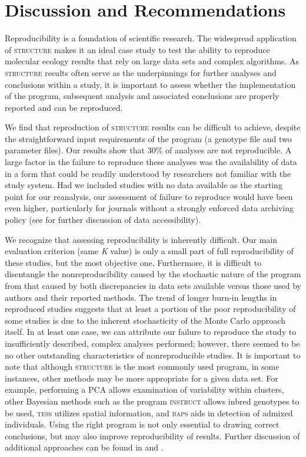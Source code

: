 \section{Discussion and Recommendations}
Reproducibility is a foundation of scientific research. The widespread application of \textsc{structure} 
makes it an ideal case study to test the ability to reproduce molecular ecology results that rely on large 
data sets and complex algorithms. As \textsc{structure} results often serve as the underpinnings for 
further analyses and conclusions within a study, it is important to assess whether the implementation 
of the program, subsequent analysis and associated conclusions are properly reported and can be reproduced.

We find that reproduction of \textsc{structure} results can be difficult to achieve, despite the 
straightforward input requirements of the program (a genotype file and two parameter files). Our 
results show that 30\% of analyses are not reproducible. A large factor in the failure to reproduce 
these analyses was the availability of data in a form that could be readily understood by researchers 
not familiar with the study system. Had we included studies with no data available as the starting 
point for our reanalysis, our assessment of failure to reproduce would have been even higher, particularly 
for journals without a strongly enforced data archiving policy (see \citealt{Vines:2013} for further discussion of data accessibility).

We recognize that assessing reproducibility is inherently difficult. Our main evaluation criterion 
(same \emph{K} value) is only a small part of full reproducibility of these studies, but the most 
objective one. Furthermore, it is difficult to disentangle the nonreproducibility caused by the 
stochastic nature of the program from that caused by both discrepancies in data sets available versus 
those used by authors and their reported methods. The trend of longer burn-in lengths in reproduced 
studies suggests that at least a portion of the poor reproducibility of some studies is due to the 
inherent stochasticity of the Monte Carlo approach itself. In at least one case, we can attribute 
our failure to reproduce the study to insufficiently described, complex analyses performed; however, 
there seemed to be no other outstanding characteristics of nonreproducible studies. It is important 
to note that although \textsc{structure} is the most commonly used program, in some instances, other methods
may be more appropriate for a given data set. For example, performing a PCA allows examination of 
variability within clusters, other Bayesian methods such as the program \textsc{instruct} \citep{Gao-etal:2007} 
allows inbred genotypes to be used, \textsc{tess} \citep{Chen:2007} utilizes spatial information, 
and \textsc{baps} \citep{Corander:2003, Corander:2004, Corander:2006, CoranderMarttinen:2006} aids in detection 
of admixed individuals. Using the right program is not only essential to drawing correct conclusions, 
but may also improve reproducibility of results. Further discussion of additional approaches can be 
found in \citet{Latch:2006} and \citet{Franccois:2010}.

